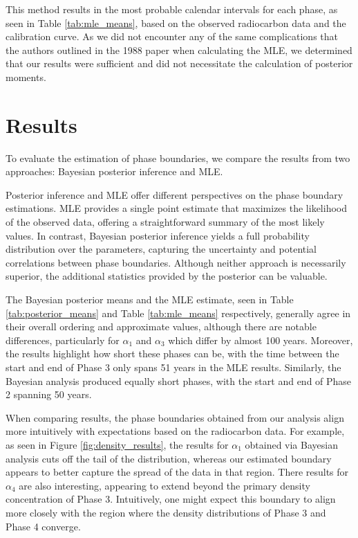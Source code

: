 \documentclass{article}
\begin{document}
This method results in the most probable calendar intervals for each phase, as seen in Table \ref{tab:mle_means}, based on the observed radiocarbon data and the calibration curve. As we did not encounter any of the same complications that the authors outlined in the 1988 paper when calculating the MLE, we determined that our results were sufficient and did not necessitate the calculation of posterior moments.


\section{Results} 
To evaluate the estimation of phase boundaries, we compare the results from two approaches: Bayesian posterior inference and MLE.

Posterior inference and MLE offer different perspectives on the phase boundary estimations. MLE provides a single point estimate that maximizes the likelihood of the observed data, offering a straightforward summary of the most likely values. In contrast, Bayesian posterior inference yields a full probability distribution over the parameters, capturing the uncertainty and potential correlations between phase boundaries. Although neither approach is necessarily superior, the additional statistics provided by the posterior can be valuable.

The Bayesian posterior means and the MLE estimate, seen in Table \ref{tab:posterior_means} and Table \ref{tab:mle_means} respectively, generally agree in their overall ordering and approximate values, although there are notable differences, particularly for $\alpha_1$ and $\alpha_3$ which differ by almost 100 years. Moreover, the results highlight how short these phases can be, with the time between the start and end of Phase 3 only spans 51 years in the MLE results. Similarly, the Bayesian analysis produced equally short phases, with the start and end of Phase 2 spanning 50 years. 

When comparing results, the phase boundaries obtained from our analysis align more intuitively with expectations based on the radiocarbon data. For example, as seen in Figure \ref{fig:density_results}, the results for $\alpha_1$ obtained via Bayesian analysis cuts off the tail of the distribution, whereas our estimated boundary appears to better capture the spread of the data in that region. There results for $\alpha_4$ are also interesting, appearing to extend beyond the primary density concentration of Phase 3. Intuitively, one might expect this boundary to align more closely with the region where the density distributions of Phase 3 and Phase 4 converge. 
\end{document}
